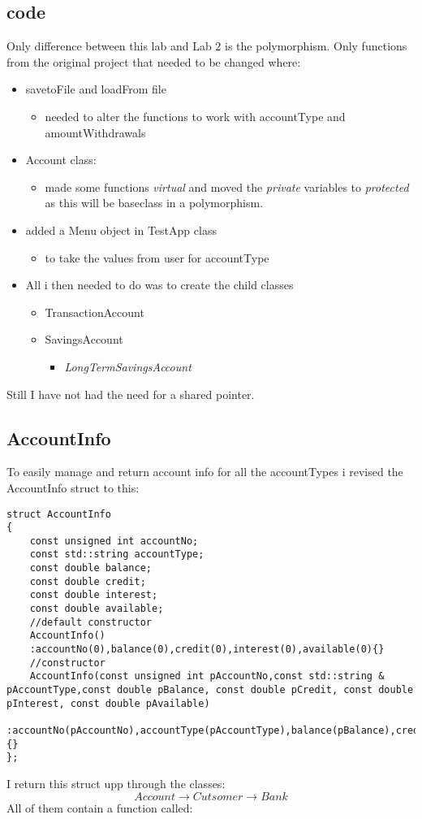 \documentclass[11pt]{article}
\begin{document}
\subsection{code}
Only difference between this lab and Lab 2 is the polymorphism.
Only functions from the original project that needed to be changed where: 
\begin{itemize}
	\item savetoFile and loadFrom file
	\begin{itemize}
		\item needed to alter the functions to work with accountType and amountWithdrawals
	\end{itemize}
	\item Account class:
	\begin{itemize}
		\item made some functions \emph{virtual} and moved the \emph{private} variables to \emph{protected} as this will be baseclass in a polymorphism.
	\end{itemize}
	\item added a Menu object in TestApp class 
	\begin{itemize}
		\item to take the values from user for accountType
	\end{itemize}
	\item All i then needed to do was to create the child classes
	\begin{itemize}
		\item TransactionAccount
		\item SavingsAccount
		\begin{itemize}
			\item \emph{LongTermSavingsAccount}
		\end{itemize}
	\end{itemize}
\end{itemize}

Still I have not had the need for a shared pointer. 

\subsection{AccountInfo}
To easily manage and return account info for all the accountTypes i revised the AccountInfo struct to this:
\begin{lstlisting}
struct AccountInfo
{
	const unsigned int accountNo;
	const std::string accountType;
	const double balance;
	const double credit;
	const double interest;
	const double available;
	//default constructor
	AccountInfo()
	:accountNo(0),balance(0),credit(0),interest(0),available(0){}
	//constructor
	AccountInfo(const unsigned int pAccountNo,const std::string & pAccountType,const double pBalance, const double pCredit, const double pInterest, const double pAvailable)
	:accountNo(pAccountNo),accountType(pAccountType),balance(pBalance),credit(pCredit),interest(pInterest),available(pAvailable){}
};
\end{lstlisting}
I return this struct upp through the classes: 
$$Account \rightarrow Cutsomer \rightarrow Bank$$
All of them contain a function called: 
\end{document}
